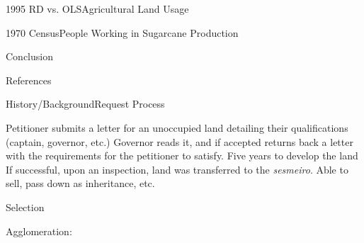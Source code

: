 \documentclass[aspectratio=1610]{beamer}
\begin{document}
\begin{frame}{1995 RD vs. OLS}{Agricultural Land Usage}
    \small
    
\end{frame}

\begin{frame}{1970 Census}{People Working in Sugarcane Production}
    \begin{figure}[h!]
        \begin{center}
        \end{center}
      \end{figure}
\end{frame}

\begin{frame}{Conclusion}
    
\end{frame}

\begin{frame}{References}
    \printbibliography
\end{frame}

\appendix

\begin{frame}{History/Background}{Request Process}
    \begin{outline}
        \1 Petitioner submits a letter for an unoccupied land detailing their qualifications (captain, governor, etc.)
        \vspace{1mm}
        \pause 
        \1 Governor reads it, and if accepted returns back a letter with the requirements for the petitioner to satisfy.
        \vspace{1mm}
        \pause 
        \1 Five years to develop the land
        \vspace{1mm}
        \pause 
        \1 If successful, upon an inspection, land was transferred to the \textit{sesmeiro}.
        \vspace{1mm}
        \pause 
        \1 Able to sell, pass down as inheritance, etc. 
    \end{outline}
\end{frame}

\begin{frame}{Selection}\hypertarget{selection}{}
    \begin{outline}
        \1 Agglomeration: \hyperlink{agglomeration}{}
    \end{outline}
\end{frame}
\end{document}
